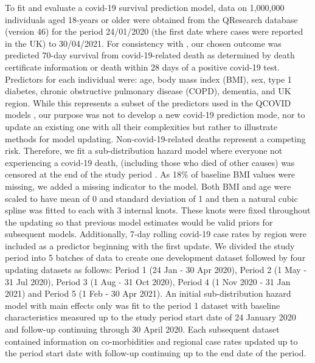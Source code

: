 \documentclass[]{article}
\begin{document}
To fit and evaluate a covid-19 survival prediction model, data on 1,000,000 individuals aged 18-years or older were obtained from the QResearch database (version 46) for the period 24/01/2020 (the first date where cases were reported in the UK) to 30/04/2021. For consistency with \citet{Hippisley-Cox2021}, our chosen outcome was predicted 70-day survival from covid-19-related death as determined by death certificate information or death within 28 days of a positive covid-19 test. Predictors for each individual were: age, body mass index (BMI), sex, type 1 diabetes, chronic obstructive pulmonary disease (COPD), dementia, and UK region. While this represents a subset of the predictors used in the QCOVID models \citep{Clift2020, Hippisley-Cox2021}, our purpose was not to develop a new covid-19 prediction mode, nor to update an existing one with all their complexities but rather to illustrate methods for model updating. Non-covid-19-related deaths represent a competing risk. Therefore, we fit a sub-distribution hazard model where everyone not experiencing a covid-19 death, (including those who died of other causes) was censored at the end of the study period \citep{Fine1999}. As 18\% of baseline BMI values were missing, we added a missing indicator to the model. Both BMI and age were scaled to have mean of 0 and standard deviation of 1 and then a natural cubic spline was fitted to each with 3 internal knots. These knots were fixed throughout the updating so that previous model estimates would be valid priors for subsequent models. Additionally, 7-day rolling covid-19 case rates by region were included as a predictor \citep{UKCovidDashboard2022} beginning with the first update. We divided the study period into 5 batches of data to create one development dataset followed by four updating datasets as follows: Period 1 (24 Jan - 30 Apr 2020), Period 2 (1 May - 31 Jul 2020), Period 3 (1 Aug - 31 Oct 2020), Period 4 (1 Nov 2020 - 31 Jan 2021) and Period 5 (1 Feb - 30 Apr 2021). An initial sub-distribution hazard model with main effects only was fit to the period 1 dataset with baseline characteristics measured up to the study period start date of 24 January 2020 and follow-up continuing through 30 April 2020. Each subsequent dataset contained information on co-morbidities and regional case rates updated up to the period start date with follow-up continuing up to the end date of the period.  
\end{document}
